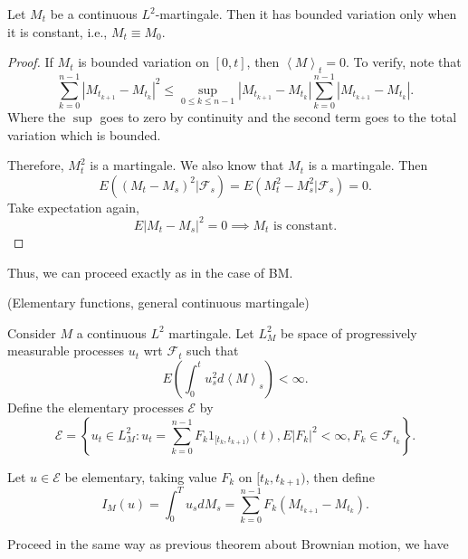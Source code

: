 
\begin{proposition}
	Let $M_t$ be a continuous $L^2$-martingale. Then it has bounded variation only when it is constant, i.e., $M_t \equiv M_0$.
\end{proposition}
\begin{proof}
If $M _t$ is bounded variation on $[0,t]$, then $\left\langle M \right\rangle _t = 0$. To verify, note that
\[
	\sum_{k = 0}^{n - 1} \left| M_{t_{k+1}} - M_{t_k} \right| ^2
	\le \sup _{0\le k\le n-1} \left| M_{t_{k+1}} - M_{t_k} \right| \sum_{k=0}^{n-1} \left| M_{t_{k+1}} - M_{t_k} \right|
.\] 
Where the $\sup $ goes to zero by continuity and the second term goes to the total variation which is bounded.

Therefore, $M_t^2$ is a martingale. We also know that $M_t$ is a martingale. Then
\[
	E\left( \left( M_t - M_s \right) ^2 | \mathcal{F}_s\right)	
	= E\left( M_t^2 - M_s^2 | \mathcal{F}_s \right) 
	= 0
.\] 
Take expectation again,
\[
	E | M_t - M_s| ^2 = 0 \implies M_t \text{ is constant}
.\] 
\end{proof}

Thus, we can proceed exactly as in the case of BM.

\begin{definition}(Elementary functions, general continuous martingale)
	
Consider $M$ a continuous $L^2$ martingale.
Let $L_M^2$ be space of progressively measurable processes $u_ t$ wrt $\mathcal{F}_t$ such that
\[
	E\left( \int _0^t u_s^2 d\left\langle M \right\rangle _s \right) < \infty 
.\] 
Define the elementary processes $\mathcal{E}$ by
\[
	\mathcal{E} = \left\{ u_t \in L^2_M: u_t = \sum_{k = 0}^{n - 1} F_k 1_{[t_k, t_{k+1})}(t), E|F_k|^2 < \infty , F_k \in \mathcal{F}_{t_k} \right\} 
.\] 

Let $u \in \mathcal{E}$ be elementary, taking value $F_k $ on $[t_k, t_{k+1})$, then define
\[
	I_M(u) = \int _0^T u_s d M_s = \sum_{k = 0}^{n - 1} F_k \left( M_{t_{k+1}} - M_{t_k} \right) 
.\] 
\end{definition}

Proceed in the same way as previous theorem about Brownian motion, we have


